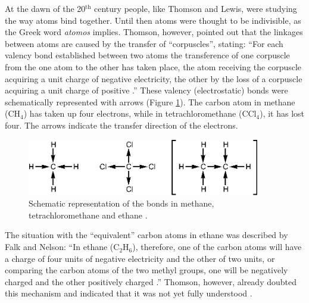 At the dawn of the 20$^\mathrm{th}$ century people, like Thomson and Lewis, were studying the way atoms bind together. Until then atoms were thought to be indivisible, as the Greek word \textit{atomos} implies. Thomson, however, pointed out that the linkages between atoms are caused by the transfer of ``corpuscles'', stating: ``For each valency bond established between two atoms the transference of one corpuscle from the one atom to the other has taken place, the atom receiving the corpuscle acquiring a unit charge of negative electricity, the other by the loss of a corpuscle acquiring a unit charge of positive \cite{thomson}.'' These valency (electrostatic) bonds were schematically represented with arrows (Figure \ref{ch1.fig1}). The carbon atom in methane (CH$_4$) has taken up four electrons, while in tetrachloromethane (CCl$_4$), it has lost four. The arrows indicate the transfer direction of the electrons. 
\begin{figure}[htp]
\center
\includegraphics[width=4in]{introduction/figures/figure1.eps}
\caption{Schematic representation of the bonds in methane, tetrachloromethane and ethane \cite{falk}.}
\label{ch1.fig1}
\end{figure}
The situation with the ``equivalent'' carbon atoms in ethane was described by Falk and Nelson: ``In ethane (C$_2$H$_6$), therefore, one of the carbon atoms will have a charge of four units of negative electricity and the other of two units, or comparing the carbon atoms of the two methyl groups, one will be negatively charged and the other positively charged \cite{falk}.'' Thomson, however, already doubted this mechanism and indicated that it was not yet fully understood \cite{thomson}.

